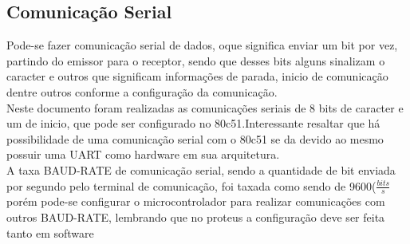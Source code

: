 \documentclass{Fabiano_file}
\begin{document}
\subsection{Comunicação Serial}
Pode-se fazer comunicação serial de dados, oque significa enviar um bit por vez, partindo do emissor para o receptor, sendo que desses bits alguns sinalizam
o caracter e outros que significam informações de parada, inicio de comunicação dentre outros conforme  a configuração da comunicação.\\
Neste documento foram realizadas as comunicações seriais de 8 bits de caracter e um de inicio, que pode ser configurado no 80c51.Interessante resaltar 
que há possibilidade de uma comunicação serial com o 80c51 se da devido ao mesmo possuir uma UART como hardware em sua arquitetura.\\
A taxa BAUD-RATE de comunicação serial, sendo a quantidade de bit enviada por segundo pelo terminal de comunicação, foi taxada como sendo de 9600($\frac{bits}{s}$ 
porém pode-se configurar o microcontrolador para realizar comunicações com outros BAUD-RATE, lembrando que no proteus a configuração deve ser feita tanto em software 
\end{document}
